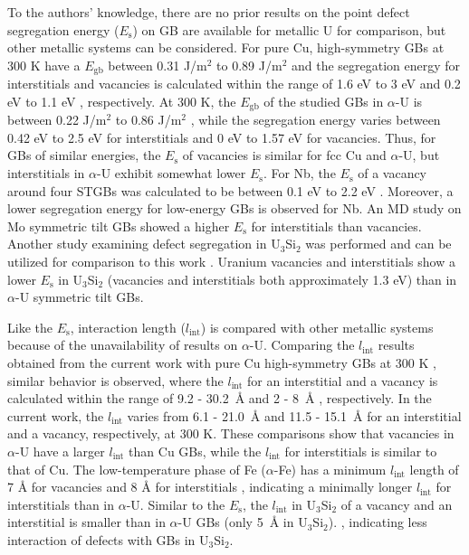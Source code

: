 \documentclass[review]{elsarticle}
\begin{document}
To the authors' knowledge, there are no prior results on the point defect segregation energy ($E_{\mathrm{s}}$) on GB are available for metallic U for comparison, but other metallic systems can be considered. For pure Cu, high-symmetry GBs at 300 K \cite{bai_cu_inter, bai_cu_gb_with_interstitial_inter} have a  $E_{\mathrm{gb}}$  between 0.31 J/m${^2}$ to 0.89 J/m${^2}$ and the segregation energy for interstitials and vacancies is calculated within the range of 1.6 eV to 3 eV and 0.2 eV to 1.1 eV \cite{bai_cu_inter}, respectively. At 300 K, the  $E_{\mathrm{gb}}$  of the studied GBs in $\alpha$-U is between 0.22 J/m${^2}$ to 0.86 J/m${^2}$ \cite{MAHBUBA2021153072}, while the segregation energy varies between 0.42 eV to 2.5 eV for interstitials and 0 eV to 1.57 eV for vacancies. Thus, for GBs of similar energies, the $E_{\mathrm{s}}$ of vacancies is similar for fcc Cu and $\alpha$-U, but interstitials in $\alpha$-U exhibit somewhat lower $E_{\mathrm{s}}$. For Nb, the $E_{\mathrm{s}}$ of a vacancy around four STGBs was calculated to be between 0.1 eV to 2.2 eV \cite{Popov2022}. Moreover, a lower segregation energy for low-energy GBs is observed for Nb. An MD study on Mo symmetric tilt GBs showed a higher $E_{\mathrm{s}}$ for interstitials than vacancies\cite{Novoselov2014}. Another study examining defect segregation in U$_3$Si$_2$ was performed and can be utilized for comparison to this work \cite{beelerUSi}. Uranium vacancies and interstitials show a lower $E_{\mathrm{s}}$ in U$_\mathrm{3}$Si$_\mathrm{2}$ (vacancies and interstitials both approximately 1.3 eV) than in $\alpha$-U symmetric tilt GBs. 

Like the $E_{\mathrm{s}}$, interaction length ($l_{\mathrm{int}}$) is compared with other metallic systems because of the unavailability of results on $\alpha$-U. Comparing the $l_{\mathrm{int}}$ results obtained from the current work with pure Cu high-symmetry GBs at 300 K \cite{bai_cu_inter, bai_cu_gb_with_interstitial_inter}, similar behavior is observed, where the  $l_{\mathrm{int}}$ for an interstitial and a vacancy is calculated within the range of 9.2 - 30.2~{\AA} and 2 - 8~{\AA} \cite{bai_cu_inter}, respectively. In the current work, the  $l_{\mathrm{int}}$ varies from 6.1 - 21.0~{\AA} and 11.5 - 15.1~{\AA} for an interstitial and a vacancy, respectively, at 300 K. These comparisons show that vacancies in $\alpha$-U have a larger  $l_{\mathrm{int}}$ than Cu GBs, while the  $l_{\mathrm{int}}$ for interstitials is similar to that of Cu. The low-temperature phase of Fe ($\alpha$-Fe) has a minimum  $l_{\mathrm{int}}$ length of 7 {\AA} for vacancies and 8 {\AA} for interstitials \cite{tschopp2012probing}, indicating a minimally longer $l_{\mathrm{int}}$ for interstitials than in $\alpha$-U. Similar to the $E_{\mathrm{s}}$, the $l_{\mathrm{int}}$ in U$_\mathrm{3}$Si$_\mathrm{2}$ of a vacancy and an interstitial is smaller than in $\alpha$-U GBs (only 5~{\AA} in U$_3$Si$_2$). \cite{beeler2019}, indicating less interaction of defects with GBs in U$_3$Si$_2$. 
\end{document}
